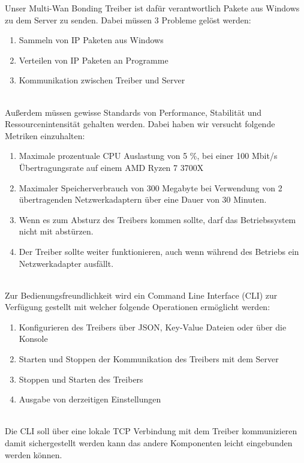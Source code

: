 Unser Multi-Wan Bonding Treiber ist dafür verantwortlich Pakete aus Windows zu dem Server zu senden. Dabei müssen 3 Probleme gelöst werden:
\\
\begin{enumerate}
    \item Sammeln von IP Paketen aus Windows
    \item Verteilen von IP Paketen an Programme
    \item Kommunikation zwischen Treiber und Server
\end{enumerate}
\ \\
Außerdem müssen gewisse Standards von Performance, Stabilität und Ressourcenintensität gehalten werden. Dabei haben wir versucht folgende Metriken einzuhalten:
\\
\begin{enumerate}
    \item Maximale prozentuale CPU Auslastung von 5 \%, bei einer 100 Mbit/s Übertragungsrate auf einem AMD Ryzen 7 3700X
    \item Maximaler Speicherverbrauch von 300 Megabyte bei Verwendung von 2 übertragenden Netzwerkadaptern über eine Dauer von 30 Minuten.
    \item Wenn es zum Absturz des Treibers kommen sollte, darf das Betriebssystem nicht mit abstürzen.
    \item Der Treiber sollte weiter funktionieren, auch wenn während des Betriebs ein Netzwerkadapter ausfällt.
\end{enumerate}
\ \\
Zur Bedienungsfreundlichkeit wird ein Command Line Interface (CLI)  zur Verfügung gestellt mit welcher folgende Operationen ermöglicht werden:
\\
\begin{enumerate}
    \item Konfigurieren des Treibers über JSON, Key-Value Dateien oder über die Konsole
    \item Starten und Stoppen der Kommunikation des Treibers mit dem Server
    \item Stoppen und Starten des Treibers
    \item Ausgabe von derzeitigen Einstellungen
\end{enumerate}
\ \\
Die CLI soll über eine lokale TCP Verbindung mit dem Treiber kommunizieren damit sichergestellt werden kann das andere Komponenten leicht eingebunden werden können.

\newpage

